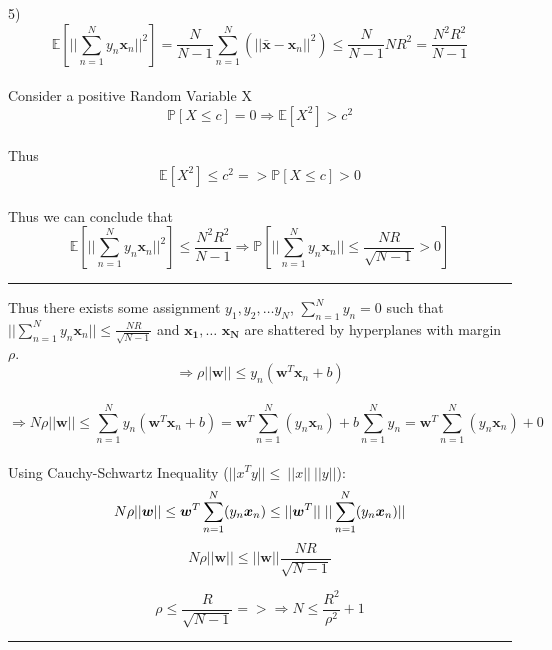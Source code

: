 \documentclass{article}
\begin{document}
\vspace{2mm}

5) $$\mathbb{E}[|| \sum_{n=1}^N y_n \bm{x}_n||^2] = \frac{N}{N-1} \sum_{n=1}^{N}(|| \bar{\bm{x}} - \bm{x}_n ||^2) \leq \frac{N}{N-1} NR^2  = \frac{N^2R^2}{N-1} $$
\\[2mm]
Consider a positive Random Variable X 
$$\mathbb{P}[X \leq c] = 0 \Rightarrow \mathbb{E}[X^2] > c^2 $$
\\[2mm]
Thus $$\mathbb{E}[X^2] \leq c^2 => \mathbb{P}[X \leq c] > 0 $$
\\[2mm]
Thus we can conclude that
$$\mathbb{E}[|| \sum_{n=1}^N y_n \bm{x}_n||^2] \leq \frac{N^2R^2}{N-1} \Rightarrow \mathbb{P}[|| \sum_{n=1}^N y_n \bm{x}_n || \leq \frac{NR}{\sqrt{N-1}} > 0] $$
\vspace{2mm}
\par\noindent\rule{\textwidth}{0.8pt}
Thus there exists some assignment $y_1, y_2, \dots  y_N$, $\sum_{n=1}^Ny_n = 0$ such that $ || \sum_{n=1}^N y_n \bm{x}_n || \leq \frac{NR}{\sqrt{N-1}}$ and $\bm{x_1}, \dots $ $ \bm{x_N} $ are shattered by hyperplanes with margin $\rho$. 
\\
$$ \Rightarrow \rho ||\bm{w}|| \leq y_n(\bm{w}^T\bm{x}_n + b) $$
\\
$$ \Rightarrow N \rho||\bm{w}|| \leq \sum_{n=1}^N y_n(\bm{w}^T \bm{x}_n + b) = \bm{w}^T \sum_{n=1}^N(y_n \bm{x}_n) + b \sum_{n=1}^N y_n = \bm{w}^T \sum_{n=1}^N(y_n \bm{x}_n) + 0  $$
\\
Using Cauchy-Schwartz Inequality ($ || x^T y || \leq \ || x || \ || y ||$): 
\\
$$ N \rho || \bm{w} || \leq  \bm{w}^T \sum_{n=1}^N(y_n \bm{x}_n) \leq ||\bm{w}^T|| \hspace{1mm} || \sum_{n=1}^N(y_n \bm{x}_n) || $$
$$ N \rho || \bm{w} || \leq || \bm{w} || \frac{NR}{\sqrt{N-1}} $$

$$ \rho \leq  \frac{R}{\sqrt{N-1}} => \Rightarrow N \leq \frac{R^2}{\rho^2} + 1 $$
\par\noindent\rule{\textwidth}{0.8pt}
\end{document}
